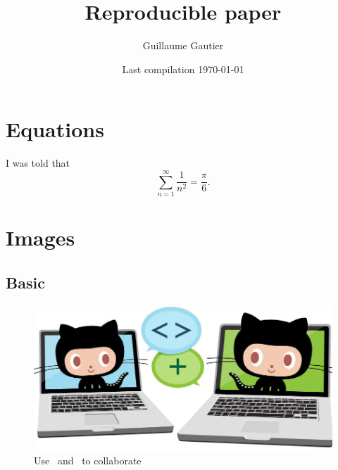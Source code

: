 \documentclass{article}
\begin{document}

\title{Reproducible paper}

\author{Guillaume Gautier}

\date{ Last compilation \today }

\maketitle




\section{Equations} %
\label{sec:equations}

	I was told that
	\begin{equation}
		\sum_{n=1}^{\infty} \frac{1}{n^2} = \frac{\pi}{6}.
	\end{equation}


\section{Images} %
\label{sec:images}

	\subsection{Basic} %
	\label{sub:basic}

		\begin{figure}[h]
			\label{fig:collabocats}
			\centering
			\includegraphics[scale=0.1]{images/collabocats.jpg}
			\caption{Use \href{https://git-scm.com/}{\textcolor{black}{\faGit}}\ and \href{https://github.com/}{\textcolor{black}{\faGithub}}\ to collaborate}
		\end{figure}
\end{document}
